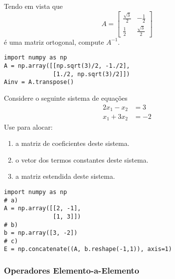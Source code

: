 \begin{exer}
  Tendo em vista que
  \begin{equation}
    A = \begin{bmatrix}
      \frac{\sqrt{3}}{2} & -\frac{1}{2} \\
      \frac{1}{2} & \frac{\sqrt{3}}{2}
    \end{bmatrix}
  \end{equation}
  é uma matriz ortogonal, compute $A^{-1}$.
\end{exer}
\begin{resp}
  
\begin{lstlisting}
import numpy as np
A = np.array([[np.sqrt(3)/2, -1./2],
              [1./2, np.sqrt(3)/2]])
Ainv = A.transpose()
\end{lstlisting}

\end{resp}

\begin{exer}
  Considere o seguinte sistema de equações
  \begin{equation}
    \begin{aligned}
      2x_1 - x_2 &= 3 \\
      x_1 + 3x_2 &= -2
    \end{aligned}
  \end{equation}
  Use {\PYTHONnumpyDOTarray} para alocar:
  \begin{enumerate}
    \item a matriz de coeficientes deste sistema.
    \item o vetor dos termos constantes deste sistema.
    \item a matriz estendida deste sistema.
  \end{enumerate}
\end{exer}
\begin{resp}

\begin{lstlisting}
import numpy as np
# a)
A = np.array([[2, -1],
              [1, 3]])
# b)
b = np.array([3, -2])
# c)
E = np.concatenate((A, b.reshape(-1,1)), axis=1)
\end{lstlisting}

\end{resp}

\subsubsection{Operadores Elemento-a-Elemento}\label{cap_matricial_sssec_op_elem-a-elem}

